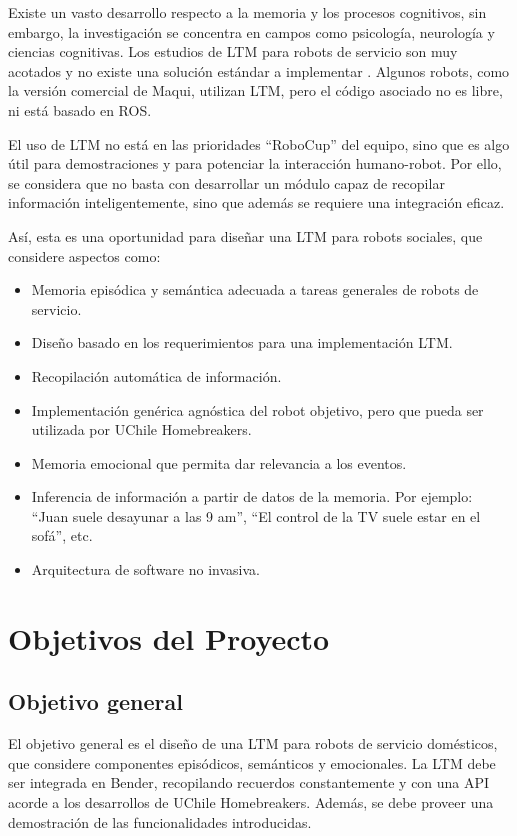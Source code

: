 Existe un vasto desarrollo respecto a la memoria y los procesos cognitivos, sin embargo, la investigación se concentra en campos como psicología, neurología y ciencias cognitivas. Los estudios de LTM para robots de servicio son muy acotados y no existe una solución estándar a implementar \cite{ltm_in_robocup}. Algunos robots, como la versión comercial de Maqui, utilizan LTM, pero el código asociado no es libre, ni está basado en ROS.

El uso de LTM no está en las prioridades ``RoboCup'' del equipo, sino que es algo útil para demostraciones y para potenciar la interacción humano-robot. Por ello, se considera que no basta con desarrollar un módulo capaz de recopilar información inteligentemente, sino que además se requiere una integración eficaz.

Así, esta es una oportunidad para diseñar una LTM para robots sociales, que considere aspectos como: 
\begin{itemize}
	\item Memoria episódica y semántica adecuada a tareas generales de robots de servicio.
	\item Diseño basado en los requerimientos para una implementación LTM.
	\item Recopilación automática de información.
	\item Implementación genérica agnóstica del robot objetivo, pero que pueda ser utilizada por UChile Homebreakers.
	\item Memoria emocional que permita dar relevancia a los eventos.
	\item Inferencia de información a partir de datos de la memoria. Por ejemplo: ``Juan suele desayunar a las 9 am'', ``El control de la TV suele estar en el sofá'', etc.
	\item Arquitectura de software no invasiva.
\end{itemize}



\section{Objetivos del Proyecto}

\subsection{Objetivo general}

El objetivo general es el diseño de una LTM para robots de servicio domésticos, que considere componentes episódicos, semánticos y emocionales. La LTM debe ser integrada en Bender, recopilando recuerdos constantemente y con una API acorde a los desarrollos de UChile Homebreakers. Además, se debe proveer una demostración de las funcionalidades introducidas.


